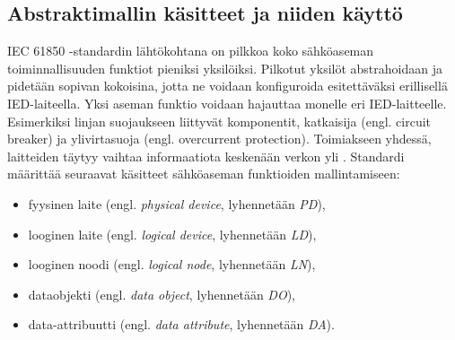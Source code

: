 \subsection{Abstraktimallin käsitteet ja niiden käyttö}
IEC 61850 -standardin lähtökohtana on pilkkoa koko sähköaseman toiminnallisuuden funktiot pieniksi yksilöiksi. Pilkotut yksilöt abstrahoidaan ja pidetään sopivan kokoisina, jotta ne voidaan konfiguroida esitettäväksi erillisellä IED-laiteella. Yksi aseman funktio voidaan hajauttaa monelle eri IED-laitteelle. Esimerkiksi linjan suojaukseen liittyvät komponentit, katkaisija (engl. circuit breaker) ja ylivirtasuoja (engl. overcurrent protection). Toimiakseen yhdessä, laitteiden täytyy vaihtaa informaatiota keskenään verkon yli \mbox{\cite[s.~31]{IEC61850-7-1}}. Standardi määrittää seuraavat käsitteet sähköaseman funktioiden mallintamiseen:
\begin{itemize}
	\item fyysinen laite (engl. \emph{physical device}, lyhennetään \emph{PD}),
	\item looginen laite (engl. \emph{logical device}, lyhennetään \emph{LD}),
	\item looginen noodi (engl. \emph{logical node}, lyhennetään \emph{LN}),
	\item dataobjekti (engl. \emph{data object}, lyhennetään \emph{DO}),
	\item data-attribuutti (engl. \emph{data attribute}, lyhennetään \emph{DA}).
\end{itemize}
